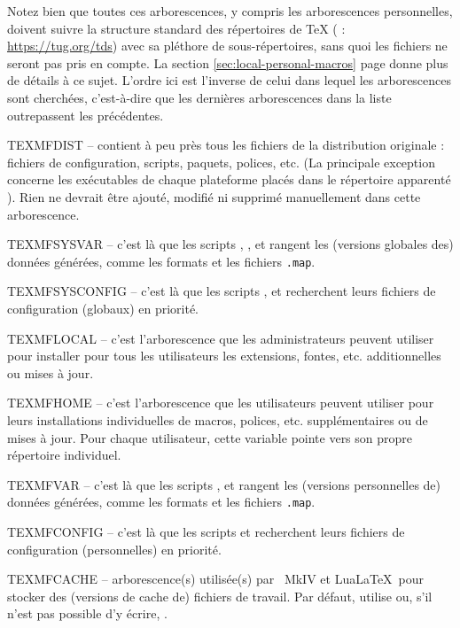 \documentclass[german, english, french, 12pt]{article}
\begin{document}
Notez bien que toutes ces arborescences, y compris les arborescences
personnelles, doivent suivre la structure standard des répertoires de \TeX{}
(\TDS{} : \url{https://tug.org/tds}) avec sa pléthore de sous-répertoires, sans
quoi les fichiers ne seront pas pris en compte. La section
\ref{sec:local-personal-macros} page \pageref{sec:local-personal-macros} donne
plus de détails à ce sujet. L'ordre ici est l'inverse de celui dans lequel les
arborescences sont cherchées, c'est-à-dire que les dernières arborescences dans
la liste outrepassent les précédentes.

\begin{ttdescription}
\item[TEXMFDIST] -- contient à peu près tous les fichiers de la distribution
  originale : fichiers de configuration, scripts, paquets, polices, etc. (La
  principale exception concerne les exécutables de chaque plateforme placés
  dans le répertoire apparenté ).  Rien ne devrait être ajouté,
  modifié ni supprimé manuellement dans cette arborescence.
\item[TEXMFSYSVAR] -- c'est là que les scripts ,
  ,  et  rangent les
  (versions globales des) données générées, comme les formats et les fichiers
  \verb+.map+.
\item[TEXMFSYSCONFIG] -- c'est là que les scripts ,
   et  recherchent leurs fichiers de
  configuration (globaux) en priorité.
\item[TEXMFLOCAL] -- c'est l'arborescence que les administrateurs peuvent
  utiliser pour installer pour tous les utilisateurs les extensions, fontes,
  etc. additionnelles ou mises à jour.
\item[TEXMFHOME] -- c'est l'arborescence que les utilisateurs peuvent utiliser
  pour leurs installations individuelles de macros, polices,
  etc. supplémentaires ou de mises à jour.  Pour chaque utilisateur, cette
  variable pointe vers son propre répertoire individuel.
\item[TEXMFVAR] -- c'est là que les scripts ,
   et  rangent les (versions
  personnelles de) données générées, comme les formats et les fichiers
  \verb+.map+.
\item[TEXMFCONFIG] -- c'est là que les scripts 
   et  recherchent leurs fichiers de
  configuration (personnelles) en priorité.
\item[TEXMFCACHE] -- arborescence(s) utilisée(s) par \ConTeXt\ MkIV et LuaLaTeX\
  pour stocker des (versions de cache de) fichiers de travail. Par défaut,
  utilise \code{TEXMFSYSVAR} ou, s'il n'est pas possible d'y écrire,
  \code{TEXMFVAR}.
\end{ttdescription}
\end{document}
